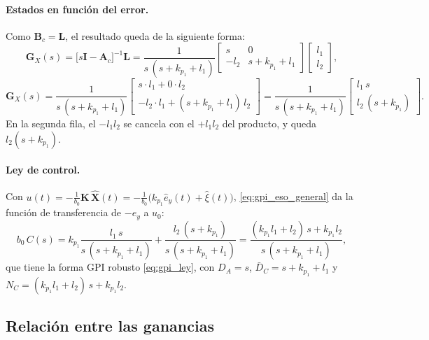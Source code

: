 \paragraph{Estados en función del error.} Como $\mathbf{B}_c = \mathbf{L}$, el resultado queda de la siguiente forma:
\begin{equation}
\mathbf{G}_X(s) = \bigl[s\mathbf{I} - \mathbf{A}_c\bigr]^{-1}\mathbf{L}
= \frac{1}{s\,(s + k_{p_1} + l_1)}
\begin{bmatrix} s & 0 \\ -l_2 & s + k_{p_1} + l_1 \end{bmatrix}
\begin{bmatrix} l_1 \\ l_2 \end{bmatrix} ,
\end{equation}
\begin{equation}
\mathbf{G}_X(s)
= \frac{1}{s\,(s + k_{p_1} + l_1)}
\begin{bmatrix} s\cdot l_1 + 0\cdot l_2 \\ -l_2\cdot l_1 + (s + k_{p_1} + l_1)\,l_2 \end{bmatrix}
= \frac{1}{s\,(s + k_{p_1} + l_1)}
\begin{bmatrix} l_1\,s \\ l_2\,(s + k_{p_1}) \end{bmatrix} .
\end{equation}
En la segunda fila, el $-l_1 l_2$ se cancela con el $+l_1 l_2$ del producto, y
queda $l_2(s + k_{p_1})$.

\paragraph{Ley de control.} Con
$u(t) = -\frac{1}{b_0}\mathbf{K}\,\widehat{\mathbf{X}}(t) = -\frac{1}{b_0}\bigl(k_{p_1}\hat{e}_y(t) + \hat{\xi}(t)\bigr)$,
\eqref{eq:gpi_eso_general} da la función de transferencia de $-e_y$ a $u_0$:
\begin{equation}
b_0\,C(s) = k_{p_1}\frac{l_1\,s}{s\,(s + k_{p_1} + l_1)} + \frac{l_2\,(s + k_{p_1})}{s\,(s + k_{p_1} + l_1)}
= \frac{(k_{p_1} l_1 + l_2)\,s + k_{p_1} l_2}{s\,(s + k_{p_1} + l_1)} ,
\label{eq:gpi_eso_tf}
\end{equation}
que tiene la forma GPI robusto \eqref{eq:gpi_ley}, con
$D_A = s$, $\bar{D}_C = s + k_{p_1} + l_1$ y $N_C = (k_{p_1} l_1 + l_2)\,s + k_{p_1} l_2$.

\subsection{Relación entre las ganancias}
\label{subsec:gpi_eso_ganancias}

